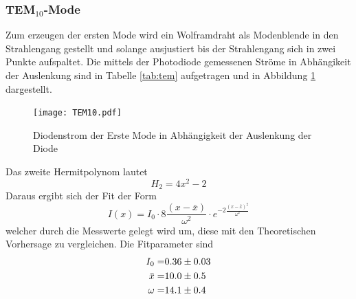\subsubsection{TEM$_\text{10}$-Mode}
Zum erzeugen der ersten Mode wird ein Wolframdraht als Modenblende in den Strahlengang gestellt und solange ausjustiert bis der Strahlengang sich in zwei Punkte aufspaltet. Die mittels der Photodiode gemessenen Ströme in Abhängikeit der Auslenkung sind in Tabelle \ref{tab:tem} aufgetragen und in Abbildung \ref{fig:TEM10} dargestellt.
\begin{figure}
  \centering
  \texttt{[image: TEM10.pdf]}
  \caption{Diodenstrom der Erste Mode in Abhängigkeit der Auslenkung der Diode}
  \label{fig:TEM10}
\end{figure}
Das zweite Hermitpolynom lautet
\begin{equation}
  H_2 = 4x^2 - 2
  \label{eqn:Herm}
\end{equation}
Daraus ergibt sich der Fit der Form 
\begin{equation}
  I(x) = I_0 \cdot 8 \frac{\left( x - \bar{x} \right)}{\omega^2} \cdot e^{-2 \frac{\left( x - \bar{x} \right)^2}{\omega^2}}
  \label{eqn:TEM10}
\end{equation}
welcher durch die Messwerte gelegt wird um, diese mit den Theoretischen Vorhersage zu vergleichen. Die Fitparameter sind
\begin{eqnarray}
  I_0 =& \num{0.36 +- 0.03}	\\
  \bar{x} =& \num{10.0 +- 0.5} \\
  \omega =& \num{14.1 +- 0.4}
\end{eqnarray}

